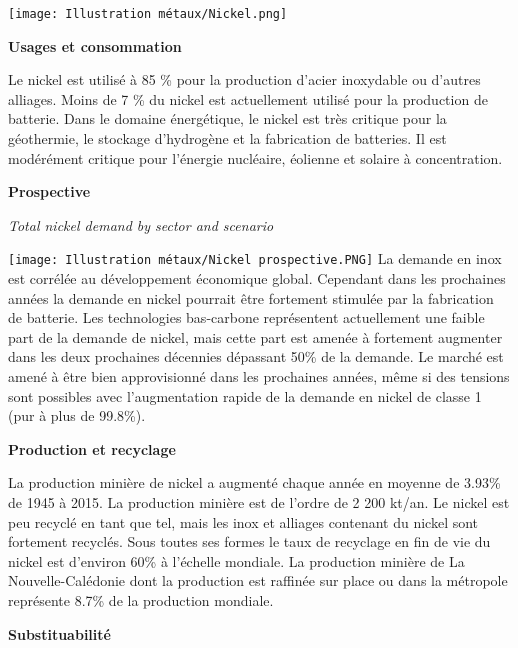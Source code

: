 \begin{center}
    \texttt{[image: Illustration métaux/Nickel.png]}
\end{center}
\begin{center}
    \textbf{Usages et consommation}
\end{center}
Le nickel est utilisé à 85 \% pour la production d'acier inoxydable ou d'autres alliages. Moins de 7 \% du nickel est actuellement
utilisé pour la production de batterie. Dans le domaine énergétique, le nickel est très critique pour
la géothermie, le stockage d'hydrogène et la fabrication de batteries. Il est modérément critique pour l'énergie
nucléaire, éolienne et solaire à concentration.

\begin{center}
    \textbf{Prospective}
\end{center}
\begin{multicols}{2}
    \begin{center}
        \textit{Total nickel demand by sector and scenario}
    \end{center}
    \texttt{[image: Illustration métaux/Nickel prospective.PNG]}
    \vfill\null
    \columnbreak
    La demande en inox est corrélée au développement économique global. Cependant dans les prochaines années
    la demande en nickel pourrait être fortement stimulée par la fabrication de batterie. Les technologies
    bas-carbone représentent actuellement une faible part de la demande de nickel, mais cette part est amenée à fortement augmenter dans les deux prochaines décennies dépassant 50\% de la demande. Le marché est amené à être bien approvisionné dans les prochaines années, même si des tensions sont possibles avec l'augmentation rapide de la demande en nickel de classe 1 (pur à plus de 99.8\%).
\end{multicols}
\begin{center}
    \textbf{Production et recyclage}
\end{center}
La production minière de nickel a augmenté chaque année en moyenne de 3.93\% de 1945 à 2015. La production minière est de l'ordre de 2 200 kt/an. Le nickel est peu recyclé
en tant que tel, mais les inox et alliages contenant du nickel sont fortement recyclés. Sous toutes ses formes
le taux de recyclage en fin de vie du nickel est d'environ 60\% à l'échelle mondiale. La production minière de La
Nouvelle-Calédonie dont la production est raffinée sur place ou dans la métropole représente 8.7\% de la production mondiale.
\begin{center}
    \textbf{Substituabilité}
\end{center}
